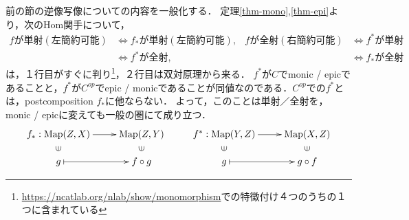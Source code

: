 \documentclass[uplatex,dvipdfmx]{jsreport}
\begin{document}
\begin{tcolorbox}[colframe=ForestGreen, colback=ForestGreen!10!white, breakable ,colbacktitle=ForestGreen!40!white, coltitle=black,fonttitle=\bfseries\sffamily,
    title=双対写像への全射と単射の持ち越し]
    前の節の逆像写像についての内容を一般化する．
    定理\ref{thm-mono},\ref{thm-epi}より，次のHom関手について，
    \begin{align*}
        fが単射(左簡約可能)&\Leftrightarrow f_*が単射(左簡約可能),&fが全射(右簡約可能)&\Leftrightarrow f^*が単射\\
        &\Leftrightarrow f^*が全射,&&\Leftrightarrow f_*が全射
    \end{align*}
    は，１行目がすぐに判り\footnote{\url{https://ncatlab.org/nlab/show/monomorphism}での特徴付け４つのうちの１つに含まれている}，２行目は双対原理から来る．
    $f^*$が$C$でmonic / epicであることと，$f^*$が$C^{op}$でepic / monicであることが同値なのである．$C^{op}$での$f^*$とは，postcomposition $f_*$に他ならない．
    よって，このことは単射／全射を，monic / epicに変えても一般の圏にて成り立つ．
    \[\xymatrix@R-2pc{
        f_*:\Map(Z,X)\ar[r]&\Map(Z,Y)&f^*:\Map(Y,Z)\ar[r]&\Map(X,Z)\\
        \rotatebox[origin=c]{90}{$\in$}&\rotatebox[origin=c]{90}{$\in$}&\rotatebox[origin=c]{90}{$\in$}&\rotatebox[origin=c]{90}{$\in$}\\
        g\ar@{|->}[r]&f\circ g&g\ar@{|->}[r]&g\circ f
    }\]
\end{tcolorbox}
\end{document}

